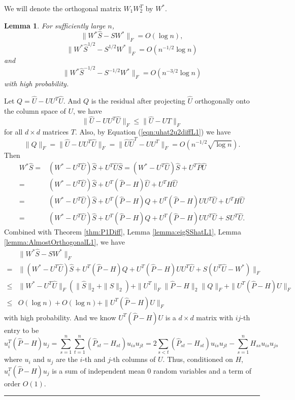 \documentclass[a4paper]{article}
\newenvironment{proof}{{\bf Proof:  }}{\hfill\rule{2mm}{2mm}}
\newtheorem{lemma}[fact]{Lemma}
\newcommand{\RT}[1]{\marginpar{\footnotesize\color{red}RT: #1}}
\begin{document}
We will denote the orthogonal matrix $W_1 W_2^T$ by $W^*$.

\begin{lemma}
\label{lemma:exchangeL1}
For sufficiently large $n$,
\[
	\| W^* \hat{S} - S W^* \|_F = O(\log n),
\]
\[
	\|W^* \hat{S}^{1/2} - S^{1/2} W^* \|_F = O(n^{-1/2} \log n)
\]
and
\[
	\| W^* \hat{S}^{-1/2} - S^{-1/2} W^* \|_F = O(n^{-3/2} \log n)
\]
with high probability.
\end{lemma}
\begin{proof}
Let $Q = \hat{U} - U U^T \hat{U}$. And $Q$ is the residual after projecting $\hat{U}$ orthogonally onto the column space of $U$, we have
\[
	\| \hat{U} - U U^T \hat{U} \|_F \le \| \hat{U} - U T \|_F
\]
for all $d \times d$ matrices $T$. Also, by Equation (\ref{eqn:uhat2u2diffL1}) we have
\begin{equation}
\label{eqn:QFnormL1}
	\| Q \|_F = \| \hat{U} - U U^T \hat{U} \|_F
	= \| \hat{U} \hat{U}^T - U U^T \|_F
    = O(n^{-1/2} \sqrt{\log n}).
\end{equation}
Then
\begin{align*}
	W^* \hat{S} = & (W^* - U^T \hat{U}) \hat{S} + U^T \hat{U} \hat{S}
    = (W^* - U^T \hat{U}) \hat{S} + U^T \hat{P} \hat{U} \\
    = & (W^* - U^T \hat{U}) \hat{S} + U^T (\hat{P} - H) \hat{U} + U^T H \hat{U} \\
    = & (W^* - U^T \hat{U}) \hat{S} + U^T (\hat{P} - H) Q + U^T (\hat{P} - H) U U^T \hat{U} + U^T H \hat{U} \\
    = & (W^* - U^T \hat{U}) \hat{S} + U^T (\hat{P} - H) Q + U^T (\hat{P} - H) U U^T \hat{U} + S U^T \hat{U}.
\end{align*}
Combined with Theorem \ref{thm:P1Diff}, Lemma \ref{lemma:eigSShatL1}, Lemma \ref{lemma:AlmostOrthogonalL1}, we have
\begin{align*}
	& \| W^* \hat{S} - S W^* \|_F \\
    = & \| (W^* - U^T \hat{U}) \hat{S} + U^T (\hat{P} - H) Q + U^T (\hat{P} - H) U U^T \hat{U} + S (U^T \hat{U} - W^*)\|_F \\
    \le & \| W^* - U^T \hat{U} \|_F (\| \hat{S} \|_2 + \| S \|_2) + \| U^T \|_F \| \hat{P} - H\|_2 \| Q \|_F + \| U^T (\hat{P} - H) U \|_F \\
    \le & O(\log n) + O(\log n) + \| U^T (\hat{P} - H) U \|_F
\end{align*}\RT{last term}
with high probability. And we know $U^T (\hat{P} - H) U$ is a $d \times d$ matrix with $ij$-th entry to be
\[
	u_i^T (\hat{P} - H) u_j
    = \sum_{s=1}^n \sum_{t=1}^n (\hat{P}_{st} - H_{st}) u_{is} u_{jt}
    = 2 \sum_{s<t} (\hat{P}_{st} - H_{st}) u_{is} u_{jt} - \sum_{s=1}^n H_{ss} u_{is} u_{js}
\]
where $u_i$ and $u_j$ are the $i$-th and $j$-th columns of $U$. Thus, conditioned on $H$, $u_i^T (\hat{P} - H) u_j$ is a sum of independent mean 0 random variables and a term of order $O(1)$.



\end{proof}
\end{document}
